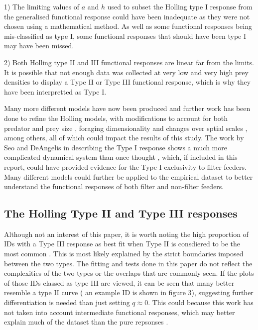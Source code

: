 \documentclass[11pt, a4paper, titlepage]{article}
\begin{document}
1) The limiting values of $a$ and $h$ used to subset the Holling type I response from the generalised functional response could have been inadequate as they were not chosen using a mathematical method. As well as some functional responses being mis-classified as type I, some functional responses that should have been type I may have been missed.

2) Both Holling type II and III functional responses are linear far from the limits. It is possible that not enough data was collected at very low and very high prey densities to display a Type II or Type III functional response, which is why they have been interpretted as Type I.

Many more different models have now been produced and  further work has been done to refine the Holling models, with modifications to account for both predator and prey size \parencite{Aljetlawi2004}, foraging dimensionality \parencite{Pawar2012} and changes over sptial scales  \parencite{Rincon2017}, among others, all of which could impact the results of this study. The work by Seo and DeAngelis in describing the Type I response shows a much more complicated dynamical system than once thought \parencite{Seo2011}, which, if included in this report, could have provided evidence for the Type I exclusivity to filter feeders. Many different models could further be applied to the empirical dataset to better understand the functional responses of both filter and non-filter feeders.

\subsection{The Holling Type II and Type III responses}

Although not an interest of this paper, it is worth noting the high proportion of IDs with a Type III response as best fit when Type II is consdiered to be the most common \parencite{Holling1959b}. This is most likely explained by the strict boundaries imposed between the two types. The fitting and tests done in this paper do not reflect the complexities of the two types or the overlaps that are commonly seen. If the plots of those IDs classed as type III are viewed, it can be seen that many better resemble a type II curve ( an example ID is shown in figure 3), suggesting further differentiation is needed than just setting $q\approx0$. This could because this work has not taken into account intermediate functional responses, which may better explain much of the dataset than the pure repsonses \parencite{Jeschke2004}.
\end{document}
